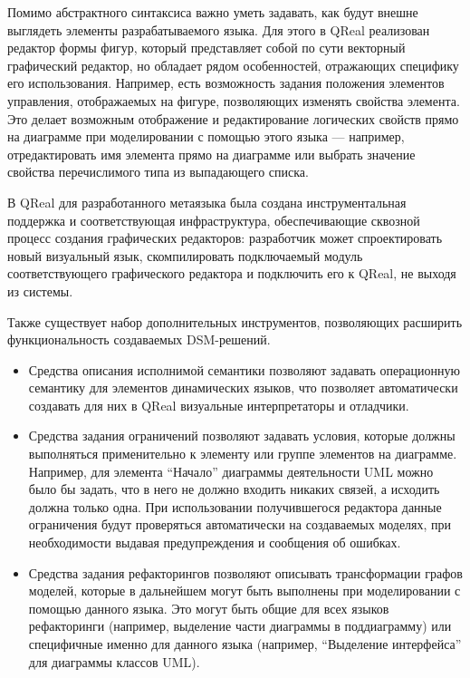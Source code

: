 \documentclass[a4, 12pt]{article}
\begin{document}
Помимо абстрактного синтаксиса важно уметь задавать, как будут внешне выглядеть элементы разрабатываемого языка. Для этого в QReal реализован редактор формы фигур, который представляет собой по сути векторный графический редактор, но обладает рядом особенностей, отражающих специфику его использования. Например, есть возможность задания положения элементов управления, отображаемых на фигуре, позволяющих изменять свойства элемента. Это делает возможным отображение и редактирование логических свойств прямо на диаграмме при моделировании с помощью этого языка --- например, отредактировать имя элемента прямо на диаграмме или выбрать значение свойства перечислимого типа из выпадающего списка.

В QReal для разработанного метаязыка была создана инструментальная поддержка и соответствующая инфраструктура, обеспечивающие сквозной процесс создания графических редакторов: разработчик может спроектировать новый визуальный язык, скомпилировать подключаемый модуль соответствующего графического редактора и подключить его к QReal, не выходя из системы. 

Также существует набор дополнительных инструментов, позволяющих расширить функциональность создаваемых DSM-решений. 

\begin{itemize}
 \item Средства описания исполнимой семантики позволяют задавать операционную семантику для элементов динамических языков, что позволяет автоматически создавать для них в QReal визуальные интерпретаторы и отладчики.
 \item Средства задания ограничений позволяют задавать условия, которые должны выполняться применительно к элементу или группе элементов на диаграмме. Например, для элемента ``Начало'' диаграммы деятельности UML можно было бы задать, что в него не должно входить никаких связей, а исходить должна только одна. При использовании получившегося редактора данные ограничения будут проверяться автоматически на создаваемых моделях, при необходимости выдавая предупреждения и сообщения об ошибках.
 \item Средства задания рефакторингов позволяют описывать трансформации графов моделей, которые в дальнейшем могут быть выполнены при моделировании с помощью данного языка. Это могут быть общие для всех языков рефакторинги (например, выделение части диаграммы в поддиаграмму) или специфичные именно для данного языка (например, ``Выделение интерфейса'' для диаграммы классов UML).
\end{itemize}
\end{document}
